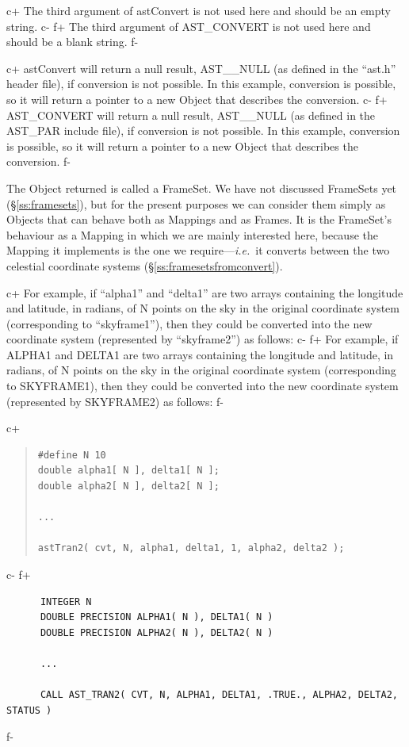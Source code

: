\documentclass[twoside,11pt]{article}
\newcommand{\secref}[1]{\S\ref{#1}}
\newcommand{\secref}[1]{\ref{#1}}
\begin{document}
c+
The third argument of astConvert is not used here and should be an
empty string.
c-
f+
The third argument of AST\_CONVERT is not used here and should be a
blank string.
f-

c+
astConvert will return a null result, AST\_\_NULL (as defined in the
``ast.h'' header file), if conversion is not possible. In this
example, conversion is possible, so it will return a pointer to a new
Object that describes the conversion.
c-
f+
AST\_CONVERT will return a null result, AST\_\_NULL (as defined in the
AST\_PAR include file), if conversion is not possible. In this
example, conversion is possible, so it will return a pointer to a new
Object that describes the conversion.
f-

The Object returned is called a FrameSet. We have not discussed
FrameSets yet (\secref{ss:framesets}), but for the present purposes we
can consider them simply as Objects that can behave both as Mappings
and as Frames. It is the FrameSet's behaviour as a Mapping in which we
are mainly interested here, because the Mapping it implements is the
one we require---{\em{i.e.}}\ it converts between the two celestial
coordinate systems (\secref{ss:framesetsfromconvert}).

c+
For example, if ``alpha1'' and ``delta1'' are two arrays containing
the longitude and latitude, in radians, of N points on the sky in the
original coordinate system (corresponding to ``skyframe1''), then they
could be converted into the new coordinate system (represented by
``skyframe2'') as follows:
c-
f+
For example, if ALPHA1 and DELTA1 are two arrays containing the
longitude and latitude, in radians, of N points on the sky in the
original coordinate system (corresponding to SKYFRAME1), then they
could be converted into the new coordinate system (represented by
SKYFRAME2) as follows:
f-

c+
\begin{quote}
\small
\begin{verbatim}
#define N 10
double alpha1[ N ], delta1[ N ];
double alpha2[ N ], delta2[ N ];

...

astTran2( cvt, N, alpha1, delta1, 1, alpha2, delta2 );
\end{verbatim}
\normalsize
\end{quote}
c-
f+
\small
\begin{verbatim}
      INTEGER N
      DOUBLE PRECISION ALPHA1( N ), DELTA1( N )
      DOUBLE PRECISION ALPHA2( N ), DELTA2( N )

      ...

      CALL AST_TRAN2( CVT, N, ALPHA1, DELTA1, .TRUE., ALPHA2, DELTA2, STATUS )
\end{verbatim}
\normalsize
f-
\end{document}
